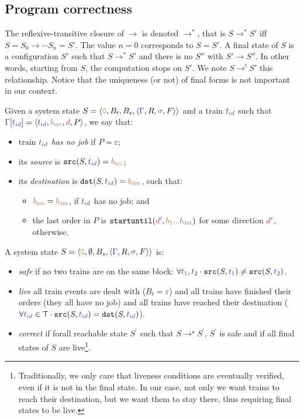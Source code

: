 \documentclass[runningheads]{llncs}
\newcommand{\tuple}[1]{\ensuremath{\langle #1\rangle}}
\newcommand{\dirFmt}[1]{{\color{dircolor} #1}}
\newcommand{\posFmt}[1]{{\color{poscolor}{#1}}}
\newcommand{\bid}[1]{\ensuremath{\posFmt{b_{#1}}}}
\newcommand{\swFmt}[1]{{\color{swcolor}{#1}}}
\newcommand{\switches}{\ensuremath{\swFmt{\sigma}}}
\newcommand{\trainFmt}[1]{{\color{traincolor} #1}}
\newcommand{\trainSeq}{\ensuremath{\trainFmt{\Gamma}}\xspace}
\newcommand{\trains}{{\trainFmt{\mathsf{T}}}}
\newcommand{\tid}[1]{\ensuremath{\trainFmt{t_{#1}}}}
\newcommand{\su}[2]{{\mbox{$\mathtt{startuntil}(\dirFmt{#1}, \posFmt{#2})$}}\xspace}
\newcommand{\emptyTrainProg}{\varepsilon}
\newcommand{\regulator}{\ensuremath{R}}
\newcommand{\signals}{\ensuremath{F}}
\newcommand{\stateTuple}[4]{\tuple{#1, #2, #3, #4}}
\newcommand{\guardFmt}[1]{{\color{guardcolor} \ensuremath{\mathtt{#1}}}}
\newcommand{\guardG}{\guardFmt{G}}
\newcommand{\bufferFmt}[1]{#1}
\newcommand{\emptyList}{\ensuremath{\varepsilon}}
\newcommand{\bufTrain}{\ensuremath{\bufferFmt{B_t}}\xspace}
\newcommand{\bufSig}{\ensuremath{\bufferFmt{B_s}}\xspace}
\newcommand{\reduces}{\ensuremath{\rightarrow}}
\newcommand{\redTuple}[4]{\ensuremath{\tuple{#1, \bufferFmt{#2}, \bufferFmt{#3}, #4}}}
\begin{document}
\subsection{Program correctness}

The reflexive-transitive closure of $\reduces$ is denoted $\reduces^*$, that is $S \reduces^* S'$ iff $S =S_0 \reduces \cdots S_n = S'$. The value $n = 0$ corresponds to $S = S'$.  A final state of $S$ is a configuration $S'$ such that $S \reduces^* S'$ and there is no $S''$ with $S' \reduces S''$. In other words, starting from $S$, the computation stops on $S'$. We note $S \reduces^! S'$ this relationship. Notice that the uniqueness (or not) of final forms is not important in our context.

Given a system state  $S = \redTuple{\guardG}{\bufTrain}{\bufSig}{\stateTuple{\trainSeq{}}{\regulator}{\switches}{\signals}}$ and a train $\tid{id}$ such that $\trainSeq[\tid{id}] = \tuple{\tid{id}, \bid{\text{src}}, \dirFmt{d}, P}$, we say that:
\begin{itemize}
	\item train \tid{id} \emph{has no job} if $P = \emptyTrainProg$;
	\item its \emph{source} is $\mathtt{src}(S, \tid{id}) = \bid{\text{src}}$;
	\item its \emph{destination} is $\mathtt{dst}(S, \tid{id}) = \bid{\text{dst}}$, such that:
	\begin{itemize}
		\item $\bid{\text{src}} = \bid{\text{dst}}$, if \tid{id} has no job; and
		\item the last order in $P$ is $\su{d^\prime}{\bid{1}...\bid{\text{dst}}}$ for some direction $\dirFmt{d^\prime}$, otherwise.
	\end{itemize}
\end{itemize}

A system state $S = \redTuple{\guardG}{\emptyset}{\bufSig}{\stateTuple{\trainSeq{}}{\regulator}{\switches}{\signals}}$ is:
\begin{itemize}
	\item\emph{safe} if no two trains are on the same block: $\forall \tid{1}, \tid{2}\cdot \mathtt{src}(S, \tid{1}) \neq \mathtt{src}(S, \tid{2})$.
	\item\emph{live} all train events are dealt with ($\bufTrain = \emptyList$) and all trains have finished their orders (they all have no job) and all trains have reached their destination ($\forall \tid{id}\in\trains\cdot \mathtt{src}(S, \tid{id}) = \mathtt{dst}(S, \tid{id})$).
	\item \emph{correct} if forall reachable state $S^\prime$ such that $S\reduces^\star S^\prime$, $S^\prime$ is safe and if all final states of $S$ are live\footnote{Traditionally, we only care that liveness conditions are eventually verified, even if it is not in the final state. In our case, not only we want trains to reach their destination, but we want them to stay there, thus requiring final states to be live.}.
\end{itemize}
\end{document}
